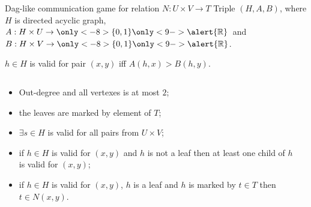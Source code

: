 \begin{frame}{Dag-like  communication game for relation $N: U \times V \to T$}
    Triple $(H, A, B)$, where $H$ is directed acyclic graph, $A: H \times U \to \only<-8>{\{0, 1\}}
    \only<9->{\alert{\mathbb{R}}}$~and $B: H \times V \to \only<-8>{\{0, 1\}} \only<9->{\alert{\mathbb{R}}}$.

    \pause
    $h \in H$ is valid for pair $(x, y)$ iff $A(h, x) > B(h, y)$.

    \pause

    \begin{columns}[t]
		\begin{column}{0.7\textwidth}
            \begin{itemize}
                \item<4-> Out-degree and all vertexes is at most $2$;
	            \item<5-> the leaves are marked by element of $T$;
    		    \item<6-> $\exists s \in H$ is valid for all pairs from $U \times V$;
		        \item<7-> if $h \in H$ is valid for $(x, y)$ and $h$ is not a leaf then at least one child of $h$ is valid for
	    	        $(x, y)$;
	    	    \item<8-> if $h \in H$ is valid for $(x, y)$, $h$ is a leaf and $h$ is marked by $t \in T$ then $t \in N(x, y)$.
	        \end{itemize}

        \end{column}
        
		\begin{column}{0.25\textwidth}
            
		\end{column}
	\end{columns}

\end{frame}


